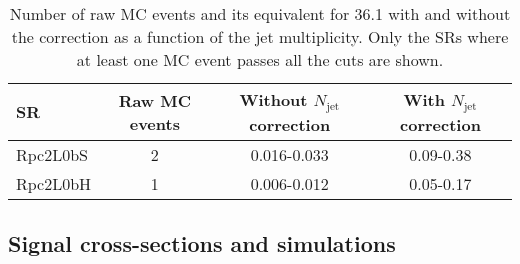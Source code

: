 \begin{table}[!htb]
\caption{Number of raw MC events and its equivalent for 36.1 \ifb with and without the correction as a function of the jet multiplicity. 
Only the SRs where at least one MC event passes all the cuts are shown.}
\label{tab:DPS_SR}
\centering
\begin{tabular}{l|c|c|c}
\hline
SR       & Raw MC events & Without $N_{\text{jet}}$ correction & With $N_{\text{jet}}$ correction \\\hline
Rpc2L0bS & 2 & 0.016-0.033 & 0.09-0.38 \\ 
Rpc2L0bH & 1 & 0.006-0.012 & 0.05-0.17 \\ 
\hline
\end{tabular}
\end{table}




\subsection*{Signal cross-sections and simulations}

